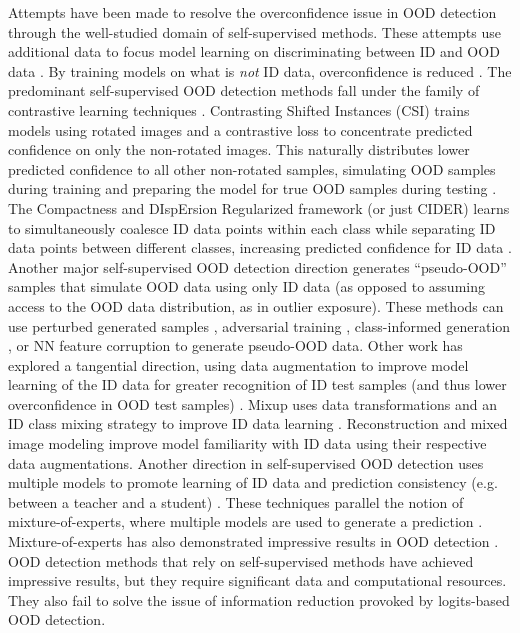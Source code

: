 Attempts have been made to resolve the overconfidence issue in OOD detection through the well-studied domain of self-supervised methods. These attempts use additional data to focus model learning on discriminating between ID and OOD data \cite{hendrycks2019scaling,hu2020hrn,bergman2019classification}. By training models on what is \emph{not} ID data, overconfidence is reduced \cite{hendrycks2019scaling}. The predominant self-supervised OOD detection methods fall under the family of contrastive learning techniques \cite{wu2018unsupervised,chen2020simple,qiu2021neural}. Contrasting Shifted Instances (CSI) trains models using rotated images and a contrastive loss to concentrate predicted confidence on only the non-rotated images. This naturally distributes lower predicted confidence to all other non-rotated samples, simulating OOD samples during training and preparing the model for true OOD samples during testing \cite{tack2020csi}. The Compactness and DIspErsion Regularized framework (or just CIDER) learns to simultaneously coalesce ID data points within each class while separating ID data points between different classes, increasing predicted confidence for ID data \cite{ming2022exploit}. Another major self-supervised OOD detection direction generates ``pseudo-OOD'' samples that simulate OOD data using only ID data (as opposed to assuming access to the OOD data distribution, as in outlier exposure). These methods can use perturbed generated samples \cite{oza2019c2ae,nalisnick2019deep}, adversarial training \cite{schlegl2019f,serra2019input}, class-informed generation \cite{wang2022cmg}, or NN feature corruption \cite{du2022vos} to generate pseudo-OOD data. Other work has explored a tangential direction, using data augmentation to improve model learning of the ID data for greater recognition of ID test samples (and thus lower overconfidence in OOD test samples) \cite{shorten2019survey,thulasidasan2019mixup,golan2018deep}. Mixup uses data transformations and an ID class mixing strategy to improve ID data learning \cite{thulasidasan2019mixup,yun2019cutmix,hendrycks2022pixmix}. Reconstruction \cite{denouden2018improving,zhou2022rethinking} and mixed image modeling \cite{li2023rethinking} improve model familiarity with ID data using their respective data augmentations. Another direction in self-supervised OOD detection uses multiple models to promote learning of ID data and prediction consistency (e.g. between a teacher and a student) \cite{cai2022semi}. These techniques parallel the notion of mixture-of-experts, where multiple models are used to generate a prediction \cite{mu2025comprehensive,yu2024boosting}. Mixture-of-experts has also demonstrated impressive results in OOD detection \cite{lulearning,hogeweg2024cood}. OOD detection methods that rely on self-supervised methods have achieved impressive results, but they require significant data and computational resources. They also fail to solve the issue of information reduction provoked by logits-based OOD detection.

